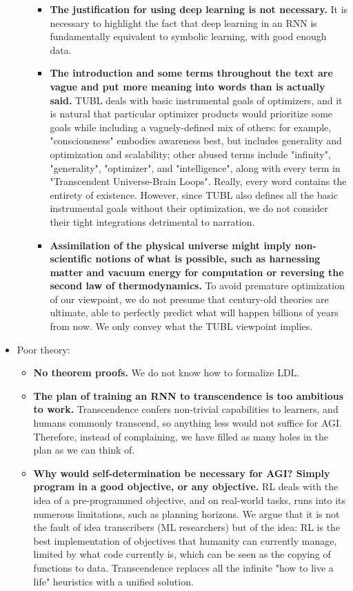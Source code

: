 \documentclass{article}
\begin{document}
\begin{itemize}
\begin{itemize}
\begin{itemize}
\item \textbf{The justification for using deep learning is not necessary.} It is necessary to highlight the fact that deep learning in an RNN is fundamentally equivalent to symbolic learning, with good enough data.
\item \textbf{The introduction and some terms throughout the text are vague and put more meaning into words than is actually said.} TUBL deals with basic instrumental goals of optimizers, and it is natural that particular optimizer products would prioritize some goals while including a vaguely-defined mix of others: for example, "consciousness" embodies awareness best, but includes generality and optimization and scalability; other abused terms include "infinity", "generality", "optimizer", and "intelligence", along with every term in "Transcendent Universe-Brain Loops". Really, every word contains the entirety of existence. However, since TUBL also defines all the basic instrumental goals without their optimization, we do not consider their tight integrations detrimental to narration.
\item \textbf{Assimilation of the physical universe might imply non-scientific notions of what is possible, such as harnessing matter and vacuum energy for computation or reversing the second law of thermodynamics.} To avoid premature optimization of our viewpoint, we do not presume that century-old theories are ultimate, able to perfectly predict what will happen billions of years from now. We only convey what the TUBL viewpoint implies.
\end{itemize}
\end{itemize}
\item Poor theory:
\begin{itemize}
\item \textbf{No theorem proofs.} We do not know how to formalize LDL.
\item \textbf{The plan of training an RNN to transcendence is too ambitious to work.} Transcendence confers non-trivial capabilities to learners, and humans commonly transcend, so anything less would not suffice for AGI. Therefore, instead of complaining, we have filled as many holes in the plan as we can think of.
\item \textbf{Why would self-determination be necessary for AGI? Simply program in a good objective, or any objective.} RL deals with the idea of a pre-programmed objective, and on real-world tasks, runs into its numerous limitations, such as planning horizons. We argue that it is not the fault of idea transcribers (ML researchers) but of the idea: RL is the best implementation of objectives that humanity can currently manage, limited by what code currently is, which can be seen as the copying of functions to data. Transcendence replaces all the infinite "how to live a life" heuristics with a unified solution.

\end{itemize}
\end{itemize}
\end{document}
